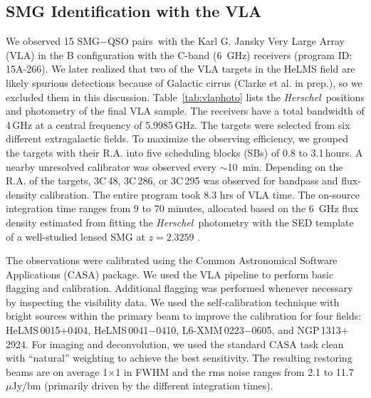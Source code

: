 \documentclass[iop,revtex4,twocolumn,apj,numberedappendix,appendixfloats]{emulateapj}
\newcommand{\hers}{{\it Herschel}}
\newcommand{\um}{$\mu$m}
\newcommand{\uJy}{$\mu$Jy}
\newcommand{\sqps}{SMG$-$QSO pairs}
\newcommand{\sqp}{SMG$-$QSO pair}
\begin{document}
\subsection{SMG Identification with the VLA}

We observed 15 \sqps\ with the Karl G. Jansky Very Large Array (VLA) in the B configuration with the C-band (6~GHz) receivers (program ID: 15A-266). We later realized that two of the VLA targets in the HeLMS field are likely spurious detections because of Galactic cirrus (Clarke et al. in prep.), so we excluded them in this discussion. Table~\ref{tab:vlaphoto} lists the \hers\ positions and photometry of the final VLA sample. The receivers have a total bandwidth of 4\,GHz at a central frequency of 5.9985\,GHz. The targets were selected from six different extragalactic fields. To maximize the observing efficiency, we grouped the targets with their R.A. into five scheduling blocks (SBs) of 0.8 to 3.1\,hours. A nearby unresolved calibrator was observed every $\sim$10~min. Depending on the R.A. of the targets, 3C\,48, 3C\,286, or 3C\,295 was observed for bandpass and flux-density calibration. The entire program took 8.3 hrs of VLA time. The on-source integration time ranges from 9 to 70 minutes, allocated based on the 6~GHz flux density estimated from fitting the \hers\ photometry with the SED template of a well-studied lensed SMG at $z = 2.3259$ \citep[SMM~J2135-0102, aka. the ``Eyelash'';][]{Swinbank10b}.

The observations were calibrated using the Common Astronomical Software Applications (CASA) package. We used the VLA pipeline to perform basic flagging and calibration. Additional flagging was performed whenever necessary by inspecting the visibility data. We used the self-calibration technique with bright sources within the primary beam to improve the calibration for four fields: HeLMS\,0015$+$0404, HeLMS\,0041$-$0410, L6-XMM\,0223$-$0605, and NGP\,1313$+$2924. For imaging and deconvolution, we used the standard CASA task {\sc clean} with ``natural'' weighting to achieve the best sensitivity. The resulting restoring beams are on average 1$\times$1 in FWHM and the rms noise ranges from 2.1 to 11.7~\uJy/bm (primarily driven by the different integration times). 

\end{document}
